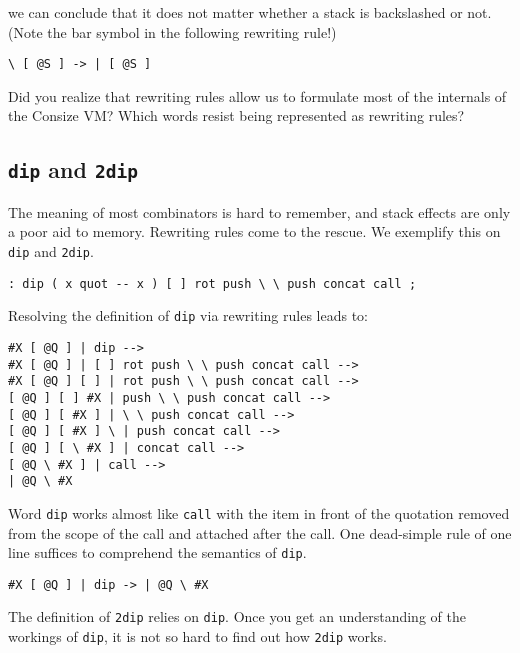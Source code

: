 we can conclude that it does not matter whether a stack is backslashed or not. (Note the bar symbol in the following rewriting rule!)

\begin{verbatim}
\ [ @S ] -> | [ @S ]
\end{verbatim}

\begin{exercise}\label{ex:rewritingVM}
Did you realize that rewriting rules allow us to formulate most of the internals of the Consize VM? Which words resist being represented as rewriting rules?
\end{exercise}

\subsection{\texttt{dip} and \texttt{2dip}}

The meaning of most combinators is hard to remember, and stack effects are only a poor aid to memory. Rewriting rules come to the rescue. We exemplify this on \verb|dip| and \verb|2dip|.

\begin{verbatim}
: dip ( x quot -- x ) [ ] rot push \ \ push concat call ;
\end{verbatim}

Resolving the definition of \verb|dip| via rewriting rules leads to:

\begin{verbatim}
#X [ @Q ] | dip -->
#X [ @Q ] | [ ] rot push \ \ push concat call -->
#X [ @Q ] [ ] | rot push \ \ push concat call -->
[ @Q ] [ ] #X | push \ \ push concat call -->
[ @Q ] [ #X ] | \ \ push concat call -->
[ @Q ] [ #X ] \ | push concat call -->
[ @Q ] [ \ #X ] | concat call -->
[ @Q \ #X ] | call -->
| @Q \ #X 
\end{verbatim}

Word \verb|dip| works almost like \verb|call| with the item in front of the quotation removed from the scope of the call and attached after the call. One dead-simple rule of one line suffices to comprehend the semantics of \verb|dip|.

\begin{verbatim}
#X [ @Q ] | dip -> | @Q \ #X
\end{verbatim}

The definition of \verb|2dip| relies on \verb|dip|. Once you get an understanding of the workings of \verb|dip|, it is not so hard to find out how \verb|2dip| works.

